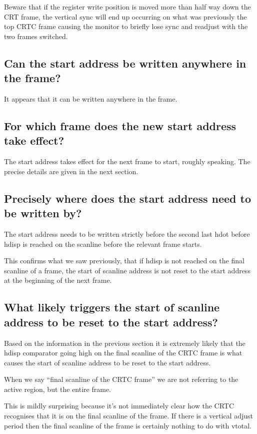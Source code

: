 \documentclass[a4paper,10pt]{amsart}
\begin{document}
Beware that if the register write position is moved more than half way down
the CRT frame, the vertical sync will end up occurring on what was previously
the top CRTC frame causing the monitor to briefly lose sync and readjust with
the two frames switched.

\subsection{Can the start address be written anywhere in the frame?}

It appears that it can be written anywhere in the frame.

\subsection{For which frame does the new start address take effect?}

The start address takes effect for the next frame to start, roughly speaking.
The precise details are given in the next section.

\subsection{Precisely where does the start address need to be written by?}

The start address needs to be written strictly before the second last hdot
before hdisp is reached on the scanline before the relevant frame starts.

This confirms what we saw previously, that if hdisp is not reached on the
final scanline of a frame, the start of scanline address is not reset to the
start address at the beginning of the next frame.

\subsection{What likely triggers the start of scanline address to be reset to
the start address?}

Based on the information in the previous section it is extremely likely that
the hdisp comparator going high on the final scanline of the CRTC frame is
what causes the start of scanline address to be reset to the start address.

When we say ``final scanline of the CRTC frame'' we are not referring to the
active region, but the entire frame.

This is mildly surprising because it's not immediately clear how the CRTC
recognises that it is on the final scanline of the frame. If there is a
vertical adjust period then the final scanline of the frame is certainly
nothing to do with vtotal.
\end{document}

